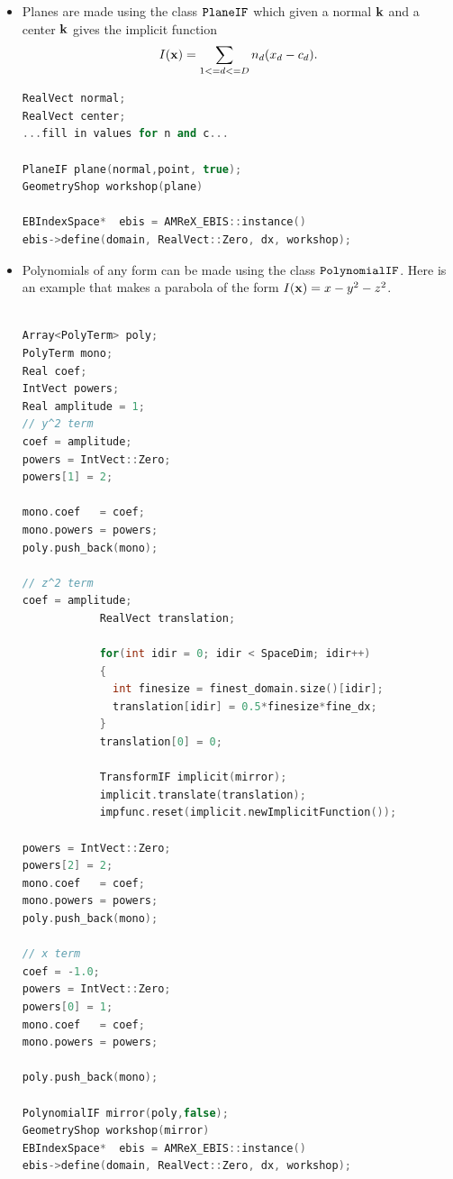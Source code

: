 \begin{itemize}

\item Planes are made using the class $\tt{PlaneIF}$ which given a normal
${\bf k}$  and a center ${\bf k}$ gives the implicit function 
$$
I({\bf x}) = \sum_{1<=d<=D} n_d (x_d - c_d).
$$

\begin{lstlisting}[language=cpp]
RealVect normal; 
RealVect center;
...fill in values for n and c...

PlaneIF plane(normal,point, true);
GeometryShop workshop(plane)

EBIndexSpace*  ebis = AMReX_EBIS::instance()
ebis->define(domain, RealVect::Zero, dx, workshop);

\end{lstlisting}

\item Polynomials of any form can be made using the class
  $\tt{PolynomialIF}$.  Here is an example that makes a parabola of
  the form $I({\bf x}) = x - y^2 - z^2$. 
\begin{lstlisting}[language=cpp]

Array<PolyTerm> poly;
PolyTerm mono;
Real coef;
IntVect powers;
Real amplitude = 1;
// y^2 term
coef = amplitude;
powers = IntVect::Zero;
powers[1] = 2;

mono.coef   = coef;
mono.powers = powers;
poly.push_back(mono);

// z^2 term
coef = amplitude;
            RealVect translation;
      
            for(int idir = 0; idir < SpaceDim; idir++)
            {
              int finesize = finest_domain.size()[idir];
              translation[idir] = 0.5*finesize*fine_dx;
            }
            translation[0] = 0;

            TransformIF implicit(mirror);
            implicit.translate(translation);
            impfunc.reset(implicit.newImplicitFunction());

powers = IntVect::Zero;
powers[2] = 2;
mono.coef   = coef;
mono.powers = powers;
poly.push_back(mono);

// x term
coef = -1.0;
powers = IntVect::Zero;
powers[0] = 1;
mono.coef   = coef;
mono.powers = powers;

poly.push_back(mono);

PolynomialIF mirror(poly,false);
GeometryShop workshop(mirror)
EBIndexSpace*  ebis = AMReX_EBIS::instance()
ebis->define(domain, RealVect::Zero, dx, workshop);
\end{lstlisting}

\end{itemize}
